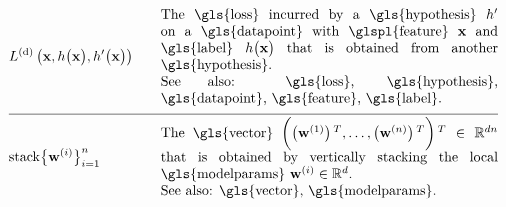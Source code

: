 \begin{align} 
	& \gtvloss{\featurevec}{\hypothesis\big(\featurevec\big)}{\hypothesis'\big(\featurevec\big)}& \quad & \parbox{.70\textwidth}{The \gls{loss} 
		incurred by a \gls{hypothesis} $\hypothesis'$ on a \gls{datapoint} with \glspl{feature} $\featurevec$ and \gls{label} 
		$\hypothesis\big( \featurevec\big)$ that is obtained from another \gls{hypothesis}.
		\\ See also: \gls{loss}, \gls{hypothesis}, \gls{datapoint}, \gls{feature}, \gls{label}. }\nonumber \\[2mm] \hline \nonumber\\[-5mm]
	& 	{\rm stack} \big\{ \weights^{(\nodeidx)} \big\}_{\nodeidx=1}^{\nrnodes} & \quad & \parbox{.70\textwidth}{The \gls{vector} 
		$\bigg( \big(\weights^{(1)}  \big)\,^{T}, \ldots, \big(\weights^{(\nrnodes)}  \big)\,^{T} \bigg)\,^{T} \in \mathbb{R}^{\dimlocalmodel\nrnodes}$ that 
		is obtained by vertically stacking the local \gls{modelparams} $\weights^{(\nodeidx)} \in \mathbb{R}^{\dimlocalmodel}$.
		\\ See also: \gls{vector}, \gls{modelparams}. } \nonumber  
\end{align}        


